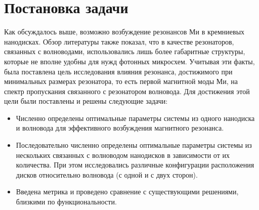\chapter{Постановка задачи}

Как обсуждалось выше, возможно возбуждение резонансов Ми в кремниевых нанодисках. Обзор литературы также показал, что в качестве резонаторов, связанных с волноводами, использовались лишь более габаритные структуры, которые не вполне удобны для нужд фотонных микросхем. Учитывая эти факты, была поставлена цель исследования влияния резонанса, достижимого при минимальных размерах резонатора, то есть первой магнитной моды Ми, на спектр пропускания связанного с резонатором волновода. Для достижения этой цели были поставлены и решены следующие задачи:

\begin{itemize}
	\item Численно определены оптимальные параметры системы из одного нанодиска и волновода для эффективного возбуждения магнитного резонанса.
	\item Последовательно численно определены оптимальные параметры системы из нескольких связанных с волноводом нанодисков в зависимости от их количества. При этом исследовались различные конфигурации расположения дисков относительно волновода (с одной и с двух сторон).
	\item Введена метрика и проведено сравнение с существующими решениями, близкими по функциональности.
\end{itemize}